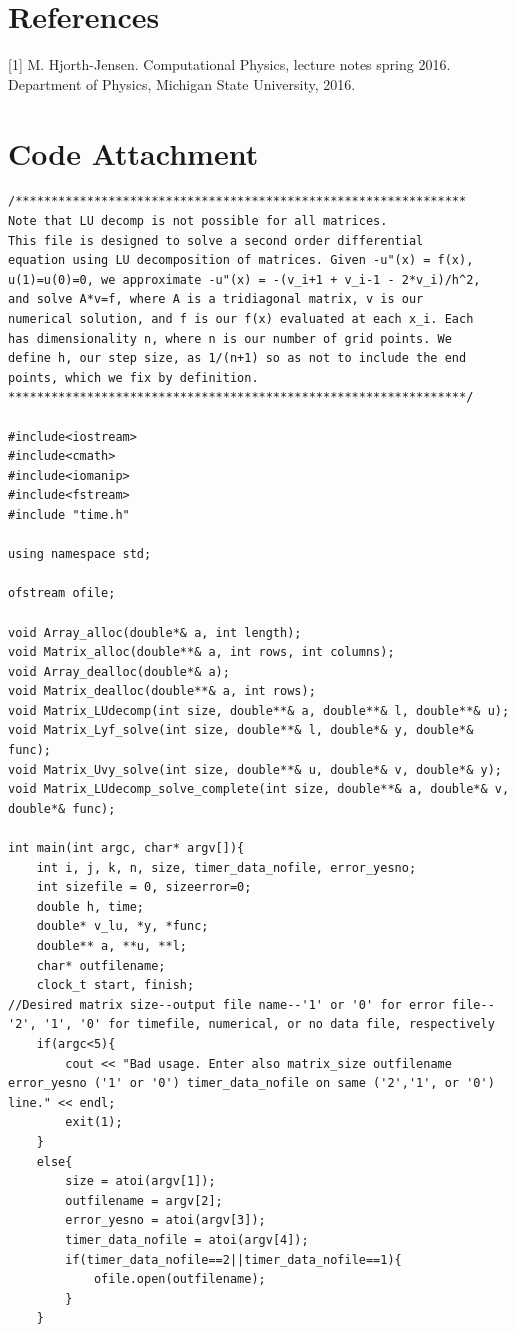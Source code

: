 \documentclass[11pt,a4paper]{article}
\begin{document}
\section{References}

[1] M. Hjorth-Jensen. Computational Physics, lecture notes spring 2016. Department of Physics, Michigan State University, 2016.

\newpage

\section*{Code Attachment}

\begin{lstlisting}[title={LUdecomp.cpp}]
/***************************************************************
Note that LU decomp is not possible for all matrices.
This file is designed to solve a second order differential
equation using LU decomposition of matrices. Given -u"(x) = f(x),
u(1)=u(0)=0, we approximate -u"(x) = -(v_i+1 + v_i-1 - 2*v_i)/h^2,
and solve A*v=f, where A is a tridiagonal matrix, v is our 
numerical solution, and f is our f(x) evaluated at each x_i. Each 
has dimensionality n, where n is our number of grid points. We 
define h, our step size, as 1/(n+1) so as not to include the end 
points, which we fix by definition.
****************************************************************/

#include<iostream>
#include<cmath>
#include<iomanip>
#include<fstream>
#include "time.h"

using namespace std;

ofstream ofile;

void Array_alloc(double*& a, int length);
void Matrix_alloc(double**& a, int rows, int columns);
void Array_dealloc(double*& a);
void Matrix_dealloc(double**& a, int rows);
void Matrix_LUdecomp(int size, double**& a, double**& l, double**& u);
void Matrix_Lyf_solve(int size, double**& l, double*& y, double*& func);
void Matrix_Uvy_solve(int size, double**& u, double*& v, double*& y);
void Matrix_LUdecomp_solve_complete(int size, double**& a, double*& v, double*& func);

int main(int argc, char* argv[]){
	int i, j, k, n, size, timer_data_nofile, error_yesno;
	int sizefile = 0, sizeerror=0;
	double h, time;
	double* v_lu, *y, *func;
	double** a, **u, **l;
	char* outfilename;
	clock_t start, finish;
//Desired matrix size--output file name--'1' or '0' for error file--'2', '1', '0' for timefile, numerical, or no data file, respectively
	if(argc<5){
		cout << "Bad usage. Enter also matrix_size outfilename error_yesno ('1' or '0') timer_data_nofile on same ('2','1', or '0') line." << endl;
		exit(1);
	}
	else{
		size = atoi(argv[1]);
		outfilename = argv[2];
		error_yesno = atoi(argv[3]);
		timer_data_nofile = atoi(argv[4]);
		if(timer_data_nofile==2||timer_data_nofile==1){
			ofile.open(outfilename);
		}
	}


\end{lstlisting}
\end{document}
